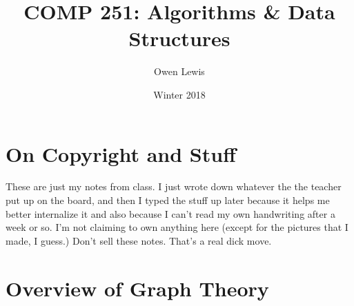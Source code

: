 \documentclass{article}
\title{COMP 251: Algorithms \& Data Structures}
\author{Owen Lewis}
\date{Winter 2018}
\begin{document}
\begin{titlepage}
\maketitle
\end{titlepage}

\tableofcontents
\newpage

\section*{On Copyright and Stuff}
These are just my notes from class. I just wrote down whatever the the teacher put up on the board, and then I typed the stuff up later because it helps me better internalize it and also because I can't read my own handwriting after a week or so. I'm not claiming to own anything here (except for the pictures that I made, I guess.) Don't sell these notes. That's a real dick move.
\newpage

\section{Overview of Graph Theory}
\end{document}
